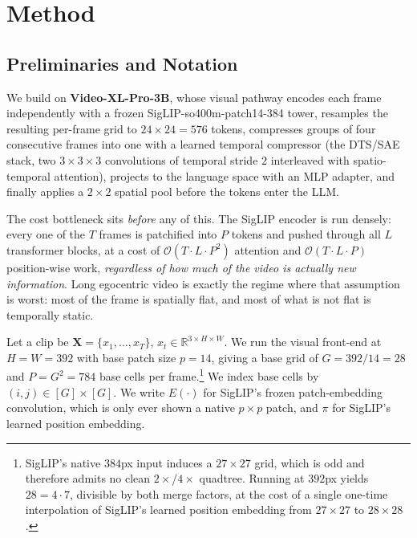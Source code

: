 
\section{Method}
\label{sec:method}

\subsection{Preliminaries and Notation}
\label{sec:prelim}

We build on \textbf{Video-XL-Pro-3B}, whose visual pathway encodes each frame
independently with a frozen SigLIP-so400m-patch14-384 tower, resamples the
resulting per-frame grid to $24\times24=576$ tokens, compresses groups of four
consecutive frames into one with a learned temporal compressor (the DTS/SAE
stack, two $3\!\times\!3\!\times\!3$ convolutions of temporal stride $2$
interleaved with spatio-temporal attention), projects to the language space with
an MLP adapter, and finally applies a $2\times2$ spatial pool before the tokens
enter the LLM.

The cost bottleneck sits \emph{before} any of this. The SigLIP encoder is run
densely: every one of the $T$ frames is patchified into $P$ tokens and pushed
through all $L$ transformer blocks, at a cost of $\mathcal{O}(T \cdot L \cdot
P^2)$ attention and $\mathcal{O}(T \cdot L \cdot P)$ position-wise work,
\emph{regardless of how much of the video is actually new information}. Long
egocentric video is exactly the regime where that assumption is worst: most of
the frame is spatially flat, and most of what is not flat is temporally static.

Let a clip be $\mathbf{X} = \{x_1, \dots, x_T\}$, $x_t \in
\mathbb{R}^{3 \times H \times W}$. We run the visual front-end at $H=W=392$ with
base patch size $p=14$, giving a base grid of $G = 392/14 = 28$ and $P = G^2 =
784$ base cells per frame.\footnote{SigLIP's native $384$px input induces a
$27\times27$ grid, which is odd and therefore admits no clean $2\times$/$4\times$
quadtree. Running at $392$px yields $28 = 4\cdot 7$, divisible by both merge
factors, at the cost of a single one-time interpolation of SigLIP's learned
position embedding from $27\times27$ to $28\times28$.} We index base cells by
$(i,j) \in [G]\times[G]$. We write $E(\cdot)$ for SigLIP's frozen patch-embedding
convolution, which is only ever shown a native $p \times p$ patch, and $\pi$ for
SigLIP's learned position embedding.

